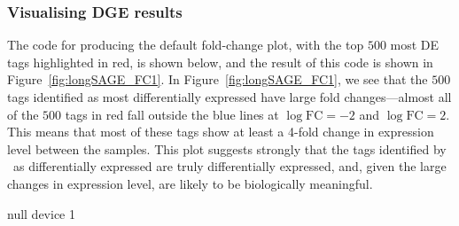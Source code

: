 \subsubsection{Visualising DGE results}
The code for producing the default fold-change plot, with the top
$500$ most DE tags highlighted in red, is shown below, and the result
of this code is shown in Figure~\ref{fig:longSAGE_FC1}. In
Figure~\ref{fig:longSAGE_FC1}, we see that the $500$ tags identified
as most differentially expressed have large fold changes---almost all
of the $500$ tags in red fall outside the blue lines at $\log
\textrm{FC} = -2$ and $\log \textrm{FC} = 2$. This means that most of
these tags show at least a 4-fold change in expression level between
the samples. This plot suggests strongly that the tags identified by
\edgeR~as differentially expressed are truly differentially expressed,
and, given the large changes in expression level, are likely to be
biologically meaningful.

\begin{Schunk}
\begin{Soutput}
null device 
          1 
\end{Soutput}
\end{Schunk}

